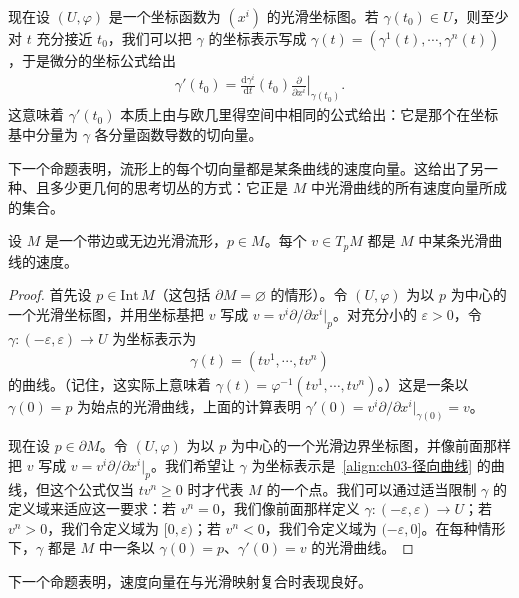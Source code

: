 \documentclass[../../main.tex]{subfiles}
\begin{document}
现在设 $(U,\varphi)$ 是一个坐标函数为 $(x^{i})$ 的光滑坐标图。若 $\gamma(t_{0})\in U$，则至少对 $t$ 充分接近 $t_{0}$，我们可以把 $\gamma$ 的坐标表示写成 $\gamma(t)=(\gamma^{1}(t),\cdots ,\gamma^{n}(t))$，于是微分的坐标公式给出
\begin{align*}
\gamma'(t_{0})=\frac{\mathrm{d}\gamma^{i}}{\mathrm{d}t}(t_{0})\left.\frac{\partial}{\partial x^{i}}\right|_{\gamma(t_{0})}.
\end{align*}
这意味着 $\gamma'(t_{0})$ 本质上由与欧几里得空间中相同的公式给出：它是那个在坐标基中分量为 $\gamma$ 各分量函数导数的切向量。

下一个命题表明，流形上的每个切向量都是某条曲线的速度向量。这给出了另一种、且多少更几何的思考切丛的方式：它正是 $M$ 中光滑曲线的所有速度向量所成的集合。

\begin{proposition}\label{proposition:ch03-切向量是速度}
设 $M$ 是一个带边或无边光滑流形，$p\in M$。每个 $v\in T_{p}M$ 都是 $M$ 中某条光滑曲线的速度。
\end{proposition}

\begin{proof}
首先设 $p\in\mathrm{Int}\,M$（这包括 $\partial M=\varnothing$ 的情形）。令 $(U,\varphi)$ 为以 $p$ 为中心的一个光滑坐标图，并用坐标基把 $v$ 写成 $v=v^{i}\partial/\partial x^{i}|_{p}$。对充分小的 $\varepsilon>0$，令 $\gamma:(-\varepsilon,\varepsilon)\to U$ 为坐标表示为
\begin{align}\label{align:ch03-径向曲线}
\gamma(t)=(tv^{1},\cdots ,tv^{n})
\end{align}
的曲线。（记住，这实际上意味着 $\gamma(t)=\varphi^{-1}(tv^{1},\cdots ,tv^{n})$。）这是一条以 $\gamma(0)=p$ 为始点的光滑曲线，上面的计算表明 $\gamma'(0)=v^{i}\partial/\partial x^{i}|_{\gamma(0)}=v$。

现在设 $p\in\partial M$。令 $(U,\varphi)$ 为以 $p$ 为中心的一个光滑边界坐标图，并像前面那样把 $v$ 写成 $v=v^{i}\partial/\partial x^{i}|_{p}$。我们希望让 $\gamma$ 为坐标表示是~\eqref{align:ch03-径向曲线} 的曲线，但这个公式仅当 $tv^{n}\geqslant 0$ 时才代表 $M$ 的一个点。我们可以通过适当限制 $\gamma$ 的定义域来适应这一要求：若 $v^{n}=0$，我们像前面那样定义 $\gamma:(-\varepsilon,\varepsilon)\to U$；若 $v^{n}>0$，我们令定义域为 $[0,\varepsilon)$；若 $v^{n}<0$，我们令定义域为 $(-\varepsilon,0]$。在每种情形下，$\gamma$ 都是 $M$ 中一条以 $\gamma(0)=p$、$\gamma'(0)=v$ 的光滑曲线。
\end{proof}

下一个命题表明，速度向量在与光滑映射复合时表现良好。
\end{document}
